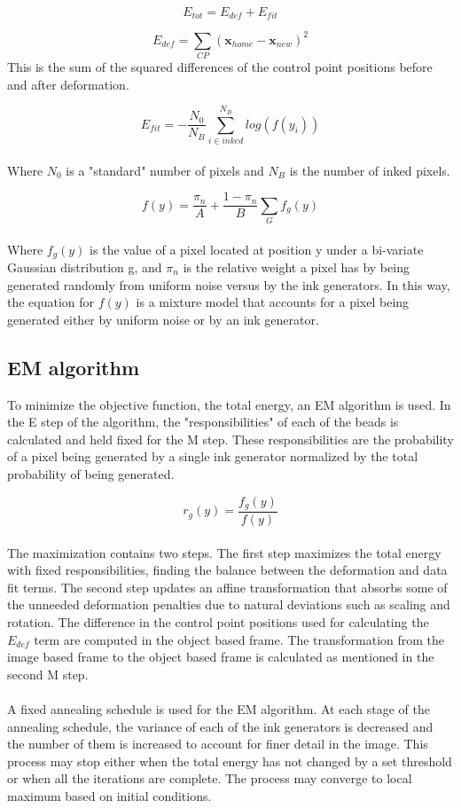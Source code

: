 \documentclass[oribibl]{llncs}
\begin{document}
$$ E_{tot} = E_{def} + E_{fit} $$

$$ E_{def} =  \sum_{CP}{(\textbf{x}_{home} - \textbf{x}_{new})^2}$$ 
This is the sum of the squared differences of the control point positions before and after deformation.

$$ E_{fit} = -\frac{N_0}{N_B}\sum_{i \in inked}^{N_B}{log(f(y_i))}  $$
\\
Where $N_0$ is a "standard" number of pixels and $N_B$ is the number of inked pixels.

$$ f(y) =  \frac{\pi_n}{A} + \frac{1-\pi_n}{B}\sum_{G}{f_g(y)}$$ 
\\
Where $f_g(y)$ is the value of a pixel located at position y under a bi-variate Gaussian distribution g, and $\pi_n$ is the relative weight a pixel has by being generated randomly from uniform noise versus by the ink generators. In this way, the equation for $f(y)$ is a mixture model that accounts for a pixel being generated either by uniform noise or by an ink generator.\\


\subsection{EM algorithm}
To minimize the objective function, the total energy, an EM algorithm is used. In the E step of the algorithm, the "responsibilities" of each of the beads is calculated and held fixed for the M step. These responsibilities are the probability of a pixel being generated by a single ink generator normalized by the total probability of being generated. 

$$ r_g(y) = \frac{f_g(y)}{f(y)} $$
\\
The maximization contains two steps. The first step maximizes the total energy with fixed responsibilities, finding the balance between the deformation and data fit terms. The second step updates an affine transformation that absorbs some of the unneeded deformation penalties due to natural deviations such as scaling and rotation. The difference in the control point positions used for calculating the $E_{def}$ term are computed in the object based frame. The transformation from the image based frame to the object based frame is calculated as mentioned in the second M step.
\\
\\
A fixed annealing schedule is used for the EM algorithm. At each stage of the annealing schedule, the variance of each of the ink generators is decreased and the number of them is increased to account for finer detail in the image. This process may stop either when the total energy has not changed by a set threshold or when all the iterations are complete. The process may converge to local maximum based on initial conditions.
\end{document}
